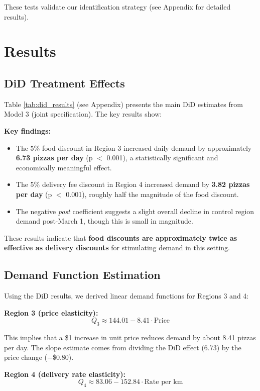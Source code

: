 \documentclass[12pt]{article}
\begin{document}
These tests validate our identification strategy (see Appendix for detailed results).

\section{Results}

\subsection{DiD Treatment Effects}

Table \ref{tab:did_results} (see Appendix) presents the main DiD estimates from Model 3 (joint specification). The key results show:

\textbf{Key findings:}
\begin{itemize}[nosep]
    \item The 5\% food discount in Region 3 increased daily demand by approximately \textbf{6.73 pizzas per day} (p $<$ 0.001), a statistically significant and economically meaningful effect.
    \item The 5\% delivery fee discount in Region 4 increased demand by \textbf{3.82 pizzas per day} (p $<$ 0.001), roughly half the magnitude of the food discount.
    \item The negative \textit{post} coefficient suggests a slight overall decline in control region demand post-March 1, though this is small in magnitude.
\end{itemize}

These results indicate that \textbf{food discounts are approximately twice as effective as delivery discounts} for stimulating demand in this setting.

\subsection{Demand Function Estimation}

Using the DiD results, we derived linear demand functions for Regions 3 and 4:

\textbf{Region 3 (price elasticity):}
\[
Q_3 \approx 144.01 - 8.41 \cdot \text{Price}
\]

This implies that a \$1 increase in unit price reduces demand by about 8.41 pizzas per day. The slope estimate comes from dividing the DiD effect (6.73) by the price change ($-$\$0.80).

\textbf{Region 4 (delivery rate elasticity):}
\[
Q_4 \approx 83.06 - 152.84 \cdot \text{Rate per km}
\]
\end{document}
